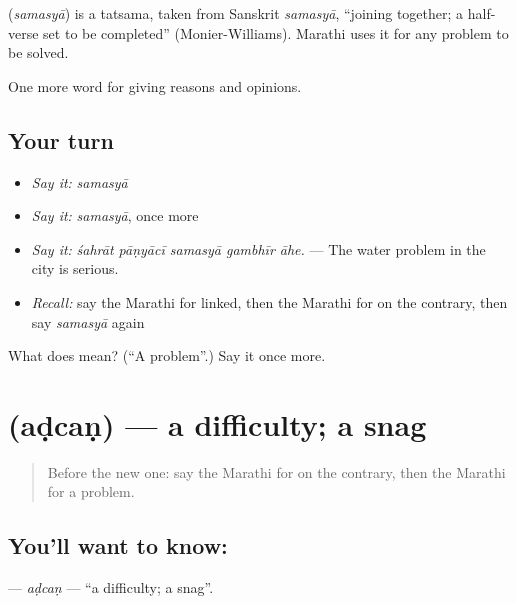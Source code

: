 \begin{cousinweb}
\textbf{} (\emph{samasyā}) is a tatsama, taken from Sanskrit \emph{samasyā}, \textquotedblleft{}joining together; a half-verse set to be completed\textquotedblright{} (Monier-Williams). Marathi uses it for any problem to be solved.
\end{cousinweb}

\begin{grammarlens}[title={What you've built}]
One more word for giving reasons and opinions.
\end{grammarlens}

\subsection*{Your turn}
\begin{itemize}
\raggedright
  \item \emph{Say it:} \emph{samasyā}
  \item \emph{Say it:} \emph{samasyā}, once more
  \item \emph{Say it:} \emph{śahrāt pāṇyācī samasyā gambhīr āhe.} — The water problem in the city is serious.
  \item \emph{Recall:} say the Marathi for linked, then the Marathi for on the contrary, then say \emph{samasyā} again
\end{itemize}

\begin{tcolorbox}[breakable,colback=teal!4,colframe=teal!35!black,title={Before you move on}]
What does  mean? (\textquotedblleft{}A problem\textquotedblright{}.) Say it once more.
\end{tcolorbox}
\section[\texorpdfstring{\mr{अडचण} (aḍcaṇ)}{अडचण (aḍcaṇ)}]{ (aḍcaṇ) — a difficulty; a snag}

\label{lesson:MR-C349-adcan}



\begin{quote}
Before the new one: say the Marathi for on the contrary, then the Marathi for a problem.
\end{quote}

\subsection*{You'll want to know: }
\textbf{} — \emph{aḍcaṇ} — \textquotedblleft{}a difficulty; a snag\textquotedblright{}.


